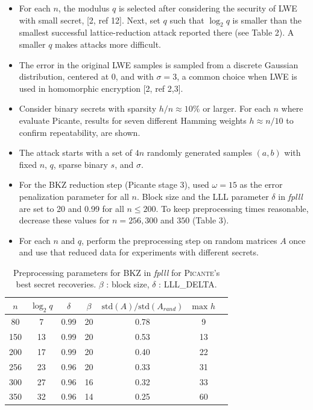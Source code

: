 \documentclass{article}
\begin{document}
\begin{itemize}
    \item For each \(n\), the modulus \(q\) is selected after considering the security of LWE with small secret, [2, ref 12]. Next, set \(q\) such that \(\log_2 q\) is smaller than the smallest successful lattice-reduction attack reported there (see Table 2). A smaller \(q\) makes attacks more difficult.
    \item The error in the original LWE samples is sampled from a discrete Gaussian distribution, centered at 0, and with \(\sigma = 3\), a common choice when LWE is used in homomorphic encryption [2, ref 2,3].
    \item Consider binary secrets with sparsity \(h/n \approx 10\%\) or larger. For each \(n\) where evaluate Picante, results for seven different Hamming weights \(h \approx n/10\) to confirm repeatability, are shown.
    \item The attack starts with a set of \(4n\) randomly generated samples \((a, b)\) with fixed \(n\), \(q\), sparse binary \(s\), and \(\sigma\).
    \item For the BKZ reduction step (Picante stage 3), used \(\omega = 15\) as the error penalization parameter for all \(n\). Block size and the LLL parameter \(\delta\) in \textit{fplll} are set to 20 and 0.99 for all \(n \leq 200\). To keep preprocessing times reasonable, decrease these values for \(n = 256, 300\) and \(350\) (Table 3).
    \item For each \(n\) and \(q\), perform the preprocessing step on random matrices \(A\) once and use that reduced data for experiments with different secrets.
\end{itemize}

\begin{table}[h]
    \centering
    \begin{tabular}{|c|c|c|c|c|c|c|}
        \hline
        \textbf{\(n\)} & \textbf{\(\log_2 q\)} & \textbf{\(\delta\)} & \textbf{\(\beta\)} & \textbf{\(\text{std}(A)/\text{std}(A_{rand})\)} & \textbf{\(\text{max } h\)} \\
        \hline
        80 & 7 & 0.99 & 20 & 0.78 & 9 \\
        150 & 13 & 0.99 & 20 & 0.53 & 13 \\
        200 & 17 & 0.99 & 20 & 0.40 & 22 \\
        256 & 23 & 0.96 & 20 & 0.33 & 31 \\
        300 & 27 & 0.96 & 16 & 0.32 & 33 \\
        350 & 32 & 0.96 & 14 & 0.25 & 60 \\
        \hline
    \end{tabular}
    \caption{Preprocessing parameters for BKZ in \textit{fplll} for \textsc{Picante}'s best secret recoveries. \(\beta\) : block size, \(\delta\) : LLL\_DELTA.}
\end{table}
\end{document}
